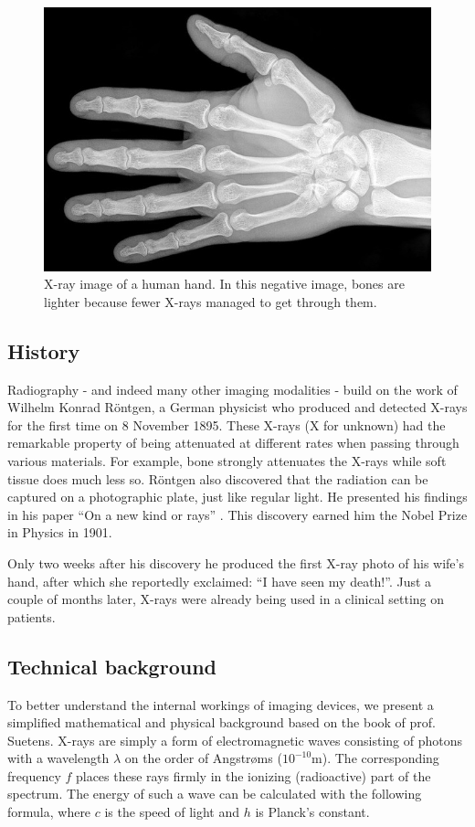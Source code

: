 \begin{figure}[ht]
\begin{center}
  \includegraphics[width=\linewidth]{img/xrayhand.jpg}
  \caption{X-ray image of a human hand. In this negative image, bones are
  lighter because fewer X-rays managed to get through them.}
  \label{fig:xrayhand}
\end{center}
\end{figure}

\subsection{History}
Radiography - and indeed many other imaging modalities - build on the work of
Wilhelm Konrad R\"ontgen, a German physicist who produced and detected X-rays
for the first time on 8 November 1895. These X-rays (X for unknown) had the
remarkable property of being attenuated at different rates when passing through
various materials. For example, bone strongly attenuates the X-rays while soft
tissue does much less so. R\"ontgen also discovered that the radiation can be
captured on a photographic plate, just like regular light. He presented his
findings in his paper ``On a new kind or rays'' \cite{rontgen}. This discovery
earned him the Nobel Prize in Physics in 1901.

Only two weeks after his discovery he produced the first X-ray photo of his
wife's hand, after which she reportedly exclaimed: ``I have seen my death!''.
Just a couple of months later, X-rays were already being used in a clinical
setting on patients.

\subsection{Technical background}
To better understand the internal workings of imaging devices, we present a
simplified mathematical and physical background based on the book of prof.
Suetens\cite{suetens}. X-rays are simply a form of electromagnetic waves
consisting of photons with a wavelength $\lambda$ on the order of Angstr\o ms
($10^{-10}$m). The corresponding frequency $f$ places these rays firmly in the
ionizing (radioactive) part of the spectrum. The energy of such a wave can be
calculated with the following formula, where $c$ is the speed of light and $h$
is Planck's constant.

